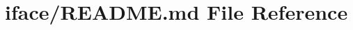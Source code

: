 \hypertarget{iface_2_r_e_a_d_m_e_8md}{}\section{iface/\+R\+E\+A\+D\+ME.md File Reference}
\label{iface_2_r_e_a_d_m_e_8md}
